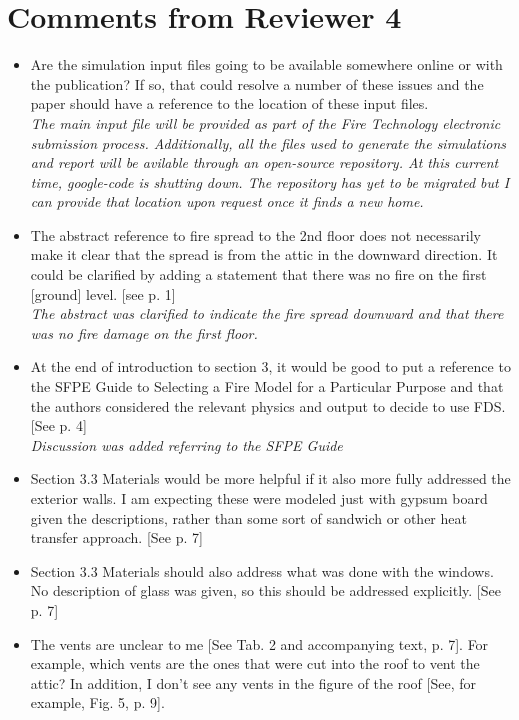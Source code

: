 \documentclass[12pt]{article}
\begin{document}
\section{Comments from Reviewer 4}
\begin{itemize}
\item Are the simulation input files going to be available somewhere online or with the publication? If so, that could resolve a number of these issues and the paper should have a reference to the location of these input files. \\
{\it The main input file will be provided as part of the Fire Technology electronic submission process. Additionally, all the files used to generate the simulations and report will be avilable through an open-source repository. At this current time, google-code is shutting down. The repository has yet to be migrated but I can provide that location upon request once it finds a new home.}
\item  The abstract reference to fire spread to the 2nd floor does not necessarily make it clear that the spread is from the attic in the downward direction. It could be clarified by adding a statement that there was no fire on the first [ground] level. [see p. 1] \\
{\it The abstract was clarified to indicate the fire spread downward and that there was no fire damage on the first floor.}
\item At the end of introduction to section 3, it would be good to put a reference to the SFPE Guide to Selecting a Fire Model for a Particular Purpose and that the authors considered the relevant physics and output to decide to use FDS. [See p. 4] \\
{\it Discussion was added referring to the SFPE Guide}
\item  Section 3.3 Materials would be more helpful if it also more fully addressed the exterior walls. I am expecting these were modeled just with gypsum board given the descriptions, rather than some sort of sandwich or other heat transfer approach. [See p. 7]
\item Section 3.3 Materials should also address what was done with the windows. No description of glass was given, so this should be addressed explicitly. [See p. 7]
\item The vents are unclear to me [See Tab. 2 and accompanying text, p. 7]. For example, which vents are the ones that were cut into the roof to vent the attic? In addition, I don't see any vents in the figure of the roof [See, for example, Fig. 5, p. 9].

\end{itemize}
\end{document}
